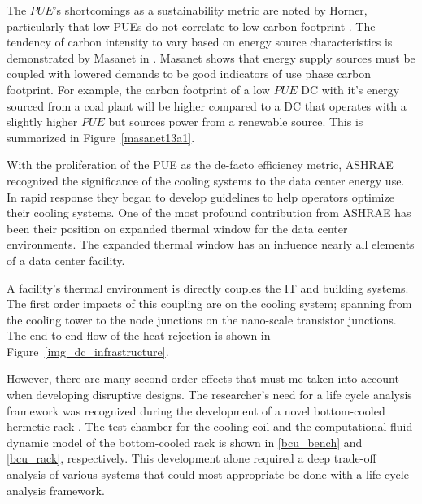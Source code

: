     The $PUE$'s shortcomings as a sustainability metric are noted by Horner, particularly that low PUEs do not correlate to low carbon footprint \cite{Horner16a}. The tendency of carbon intensity to vary based on energy source characteristics is demonstrated by Masanet in \cite{Masanet13a}. Masanet shows that energy supply sources must be coupled with lowered demands to be good indicators of use phase carbon footprint. For example, the carbon footprint of a low $PUE$ DC with it's energy sourced from a coal plant will be higher compared to a DC that operates with a slightly higher $PUE$ but sources power from a renewable source. This is summarized in Figure~\ref{masanet13a1}.
    
    
    
    With the proliferation of the PUE as the de-facto efficiency metric, ASHRAE recognized the significance of the cooling systems to the data center energy use. In rapid response they began to develop guidelines to help operators optimize their cooling systems. One of the most profound contribution from ASHRAE has been their position on expanded thermal window for the data center environments. The expanded thermal window has an influence nearly all elements of a data center facility. 
    
    
    
    A facility's thermal environment is directly couples the IT and building systems. The first order impacts of this coupling are on the cooling system; spanning from the cooling tower to the node junctions on the nano-scale transistor junctions. The end to end flow of the heat rejection is shown in Figure~\ref{img_dc_infrastructure}. 
    
    
    
    However, there are many second order effects that must me taken into account when developing disruptive designs. The researcher's need for a life cycle analysis framework was recognized during the development of a novel bottom-cooled hermetic rack \cite{gao16}. The test chamber for the cooling coil and the computational fluid dynamic model of the bottom-cooled rack is shown in \ref{bcu_bench} and \ref{bcu_rack}, respectively. This development alone required a deep trade-off analysis of various systems that could most appropriate be done with a life cycle analysis framework. 
    
    
    
